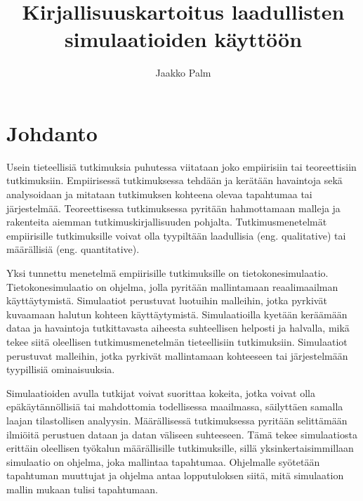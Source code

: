 \documentclass[utf8]{gradu3}
\begin{document}
\title{Kirjallisuuskartoitus laadullisten simulaatioiden käyttöön}
\abstract{%
  
}

\author{Jaakko Palm}

\maketitle

\mainmatter

\chapter{Johdanto} \label{johdanto}
Usein tieteellisiä tutkimuksia puhutessa viitataan joko empiirisiin tai teoreettisiin tutkimuksiin. Empiirisessä tutkimuksessa tehdään ja kerätään havaintoja sekä analysoidaan ja mitataan tutkimuksen kohteena olevaa tapahtumaa tai järjestelmää. Teoreettisessa tutkimuksessa pyritään hahmottamaan malleja ja rakenteita aiemman tutkimuskirjallisuuden pohjalta. Tutkimusmenetelmät empiirisille tutkimuksille voivat olla tyypiltään laadullisia (eng. qualitative) tai määrällisiä (eng. quantitative).

Yksi tunnettu menetelmä empiirisille tutkimuksille on tietokonesimulaatio. Tietokonesimulaatio on ohjelma, jolla pyritään mallintamaan reaalimaailman käyttäytymistä. 
Simulaatiot perustuvat luotuihin malleihin, jotka pyrkivät kuvaamaan halutun kohteen käyttäytymistä. Simulaatioilla kyetään keräämään dataa ja havaintoja tutkittavasta aiheesta suhteellisen helposti ja halvalla, mikä tekee siitä oleellisen tutkimusmenetelmän tieteellisiin tutkimuksiin. Simulaatiot perustuvat malleihin, jotka pyrkivät mallintamaan kohteeseen tai järjestelmään tyypillisiä ominaisuuksia. 

Simulaatioiden avulla tutkijat voivat suorittaa kokeita, jotka voivat olla epäkäytännöllisiä tai mahdottomia todellisessa maailmassa, säilyttäen samalla laajan tilastollisen analyysin. Määrällisessä tutkimuksessa pyritään selittämään ilmiöitä perustuen dataan ja datan väliseen suhteeseen. Tämä tekee simulaatiosta erittäin oleellisen työkalun määrällisille tutkimuksille, sillä yksinkertaisimmillaan simulaatio on ohjelma, joka mallintaa tapahtumaa. Ohjelmalle syötetään tapahtuman muuttujat ja ohjelma antaa lopputuloksen siitä, mitä simulaation mallin mukaan tulisi tapahtumaan. 
\end{document}
